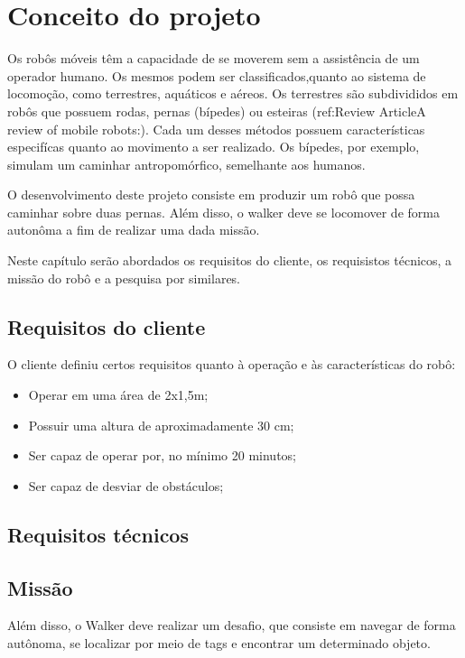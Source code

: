 \chapter{Conceito do projeto}
\label{chap:fundteor}
Os robôs móveis têm a capacidade de se moverem sem a assistência de um operador humano. Os mesmos podem ser classificados,quanto ao sistema de locomoção, como terrestres, aquáticos e aéreos. Os terrestres são subdivididos em robôs que possuem rodas, pernas (bípedes) ou esteiras (ref:Review ArticleA review of mobile robots:). Cada um desses métodos possuem características especifícas quanto ao movimento a ser realizado. Os bípedes, por exemplo, simulam um caminhar antropomórfico, semelhante aos humanos.



O desenvolvimento deste projeto consiste em produzir um robô que possa caminhar sobre duas pernas. Além disso, o walker deve se locomover de forma autonôma a fim de realizar uma dada missão.

Neste capítulo serão abordados os requisitos do cliente, os requisistos técnicos, a missão do robô e a pesquisa por similares. 



\section{Requisitos do cliente}
 O cliente definiu certos requisitos quanto à operação e  às características do robô:
 \begin{itemize}
    \item Operar em uma área de 2x1,5m;
    \item Possuir uma altura de aproximadamente 30 cm;
    \item Ser capaz de operar por, no mínimo 20 minutos;
    \item Ser capaz de desviar de obstáculos;
 \end{itemize}

 \section{Requisitos técnicos}

\lipsum[2-4]

 \section{Missão}
 \lipsum
 Além disso, o Walker deve realizar um desafio, que consiste em navegar de forma autônoma, se localizar por meio de tags e encontrar um determinado objeto.
